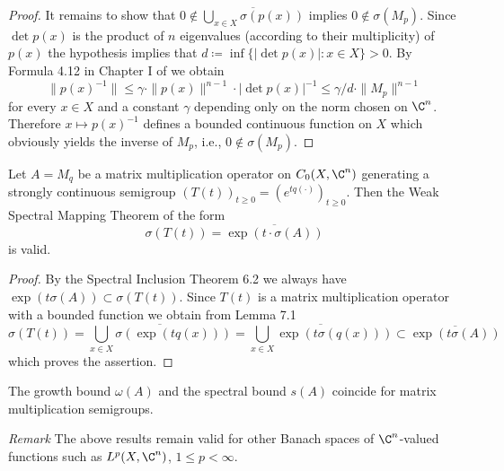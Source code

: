 \begin{proof}
It remains to show that $0 \notin \overline{\bigcup_{x\in X} \sigma(p(x))}$ implies $0 \notin \sigma(M_{p})$.
Since $\det p(x)$ is the product of $n$ eigenvalues (according to their multiplicity) of $p(x)$ the hypothesis implies that $d \coloneqq \inf\{|\det p(x)| \colon x \in X\} > 0$.
By Formula 4.12 in Chapter I of \citet{kato:1966} we obtain
\[
\|p(x)^{-1}\| \leq \gamma \cdot \|p(x)\|^{n-1} \cdot |\det p(x)|^{-1} \leq \gamma/d \cdot \|M_{p}\|^{n-1}
\]
for every $x \in X$ and a constant $\gamma$ depending only on the norm chosen on $\C^{n}$.
Therefore $x \mapsto p(x)^{-1}$ defines a bounded continuous function on $X$ which obviously yields the inverse of $M_{p}$, i.e., $0 \notin \sigma(M_{p})$.
\end{proof}

\begin{theorem}\label{thm:a3-7.2}
Let $A = M_{q}$ be a matrix multiplication operator on $C_{0}(X,\C^{n})$ generating a strongly continuous semigroup $(T(t))_{t\geq 0} = (e^{tq(\cdot)})_{t\geq 0}$.
Then the Weak Spectral Mapping Theorem of the form
\begin{equation}\label{eq:a3-7.3}
\sigma(T(t)) = \overline{\exp(t\cdot\sigma(A))}
\end{equation}
is valid.
\end{theorem}

\begin{proof}
By the Spectral Inclusion Theorem 6.2 we always have $\exp(t\sigma(A)) \subset \sigma(T(t))$.
Since $T(t)$ is a matrix multiplication operator with a bounded function we obtain from Lemma 7.1
\[
\sigma(T(t)) = \overline{\bigcup_{x\in X} \sigma(\exp(tq(x)))} = \overline{\bigcup_{x\in X} \exp(t\sigma(q(x)))} \subset \overline{\exp(t\sigma(A))}
\]
which proves the assertion.
\end{proof}

\begin{corollary}\label{cor:a3-7.3}
The growth bound $\omega(A)$ and the spectral bound $s(A)$ coincide for matrix multiplication semigroups.
\end{corollary}

\noindent
\textsl{Remark}
The above results remain valid for other Banach spaces of $\C^{n}$-valued functions such as $L^{p}(X,\C^{n})$, $1 \leq p < \infty$.

